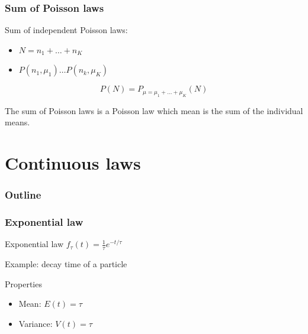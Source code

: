 \documentclass[9pt]{beamer}
\begin{document}
\begin{frame}
 \frametitle{Sum of Poisson laws}
 
 Sum of independent Poisson laws:
 
 \begin{itemize}
  \item $N = n_1 + \dots + n_K$
  \item $P(n_1,\mu_1) \dots P(n_k,\mu_K)$
 \end{itemize}
 
 $$P(N) = P_{\mu = \mu_1 + \dots + \mu_K}(N)$$
 
 The sum of Poisson laws is a Poisson law which mean is the sum of the individual means.

\end{frame}

\section{Continuous laws}

\begin{frame}
 \frametitle{Outline}
 
 \tableofcontents[current]
\end{frame}

\begin{frame}
 \frametitle{Exponential law}
 
 \begin{block}{Exponential law}
  $f_\tau (t) = \frac{1}{\tau} e^{-t/\tau}$
 \end{block}
 
 Example: decay time of a particle
 
 \begin{block}{Properties}
  \begin{itemize}
   \item Mean: $E(t) = \tau$
   \item Variance: $V(t) = \tau$
  \end{itemize}

 \end{block}


\end{frame}
\end{document}
